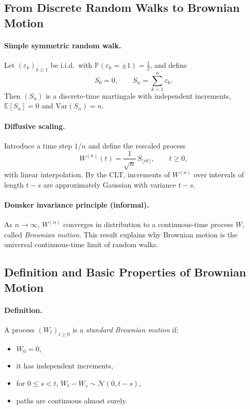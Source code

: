 \documentclass[11pt]{article}
\newcommand{\Pbb}{\mathbb{P}}
\newcommand{\E}{\mathbb{E}}
\newcommand{\Var}{\mathrm{Var}}
\newcommand{\1}{\mathbf{1}}
\theoremstyle{plain}
\theoremstyle{definition}
\theoremstyle{remark}
\begin{document}
\subsection{From Discrete Random Walks to Brownian Motion}

\paragraph{Simple symmetric random walk.}
Let $(\varepsilon_k)_{k\ge1}$ be i.i.d.\ with
$\Pbb(\varepsilon_k=\pm1)=\tfrac12$, and define
\[
S_0=0,
\qquad
S_n=\sum_{k=1}^n \varepsilon_k .
\]
Then $(S_n)$ is a discrete-time martingale with independent increments,
$\E[S_n]=0$ and $\Var(S_n)=n$.

\paragraph{Diffusive scaling.}
Introduce a time step $1/n$ and define the rescaled process
\[
W^{(n)}(t)=\frac{1}{\sqrt{n}}\,S_{\lfloor nt\rfloor},
\qquad t\ge0,
\]
with linear interpolation.
By the CLT, increments of $W^{(n)}$ over intervals of length $t-s$
are approximately Gaussian with variance $t-s$.

\paragraph{Donsker invariance principle (informal).}
As $n\to\infty$, $W^{(n)}$ converges in distribution to a continuous-time
process $W$, called \emph{Brownian motion}.
This result explains why Brownian motion is the universal
continuous-time limit of random walks.

\subsection{Definition and Basic Properties of Brownian Motion}

\paragraph{Definition.}
A process $(W_t)_{t\ge0}$ is a \emph{standard Brownian motion} if:
\begin{itemize}
  \item $W_0=0$,
  \item it has independent increments,
  \item for $0\le s<t$, $W_t-W_s\sim\mathcal N(0,t-s)$,
  \item paths are continuous almost surely.
\end{itemize}
\end{document}
